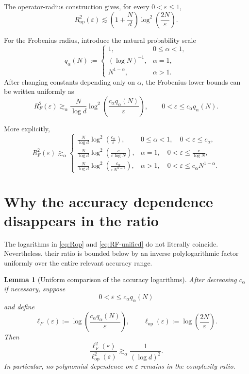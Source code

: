 \documentclass[11pt]{article}
\newtheorem{lemma}{Lemma}
\newcommand{\op}{\mathrm{op}}
\newcommand{\eps}{\varepsilon}
\begin{document}
The operator-radius construction gives, for every $0<\eps\le1$,
\begin{equation}
R_{\op}^2(\eps) \lesssim \left(1+\frac Nd\right) \log^2\left(\frac{2N}{\eps}\right).
\label{eq:Rop}
\end{equation}

For the Frobenius radius, introduce the natural probability scale
\begin{equation}
q_\alpha(N) :=
\begin{cases}
1, & 0\le\alpha<1,\\[1mm]
(\log N)^{-1}, & \alpha=1,\\[1mm]
N^{1-\alpha}, & \alpha>1.
\end{cases}
\label{eq:q-alpha}
\end{equation}
After changing constants depending only on $\alpha$, the Frobenius
lower bounds can be written uniformly as
\begin{equation}
R_F^2(\eps) \gtrsim_\alpha \frac{N}{\log d} \log^2\left( \frac{c_\alpha q_\alpha(N)}{\eps} \right),
\qquad
0<\eps\le c_\alpha q_\alpha(N).
\label{eq:RF-unified}
\end{equation}

More explicitly,
\begin{equation}
R_F^2(\eps) \gtrsim_\alpha
\begin{cases}
\displaystyle
\frac{N}{\log d} \log^2\left(\frac{c_\alpha}{\eps}\right),
& 0\le\alpha<1, \quad 0<\eps\le c_\alpha, \\[4mm]
\displaystyle
\frac{N}{\log d} \log^2\left(\frac{c}{\eps\log N}\right),
& \alpha=1, \quad 0<\eps\le \frac{c}{\log N}, \\[4mm]
\displaystyle
\frac{N}{\log d} \log^2\left( \frac{c_\alpha}{\eps N^{\alpha-1}} \right),
& \alpha>1, \quad 0<\eps\le c_\alpha N^{1-\alpha}.
\end{cases}
\label{eq:RF-cases}
\end{equation}

\section{Why the accuracy dependence disappears in the ratio}

The logarithms in \eqref{eq:Rop} and \eqref{eq:RF-unified} do not
literally coincide. Nevertheless, their ratio is bounded below by an
inverse polylogarithmic factor uniformly over the entire relevant
accuracy range.

\begin{lemma}[Uniform comparison of the accuracy logarithms]
\label{lem:epsilon-cancel}
After decreasing $c_\alpha$ if necessary, suppose
\[
0<\eps\le c_\alpha q_\alpha(N)
\]
and define
\[
\ell_F(\eps) := \log\left( \frac{c_\alpha q_\alpha(N)}{\eps} \right),
\qquad
\ell_{\op}(\eps) := \log\left(\frac{2N}{\eps}\right).
\]
Then
\[
\frac{\ell_F^2(\eps)}{\ell_{\op}^2(\eps)} \gtrsim_\alpha \frac1{(\log d)^2}.
\]
In particular, no polynomial dependence on $\eps$ remains in the
complexity ratio.
\end{lemma}
\end{document}

